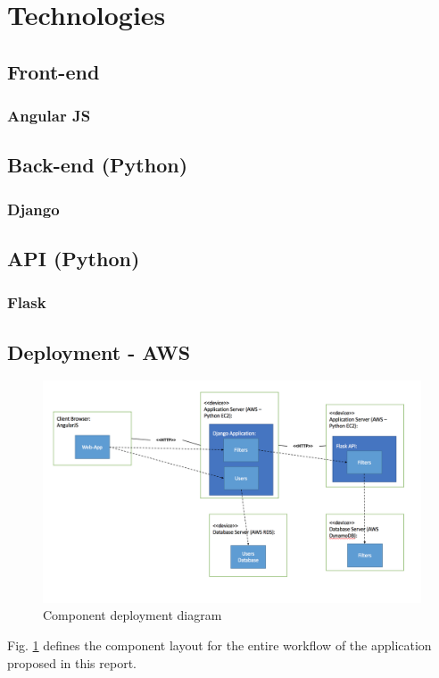 \documentclass[a4paper,12pt]{article}
\begin{document}
\section{Technologies}

  \subsection{Front-end}

    \subsubsection{Angular JS}

  \subsection{Back-end (Python)}

    \subsubsection{Django}

  \subsection{API (Python)}

    \subsubsection{Flask}


  \subsection{Deployment - AWS}

    \begin{figure}[ht]
      \centering
      \includegraphics[width=\linewidth]{deployment-diagram}
      \caption{Component deployment diagram}
      \label{fig:deployment-diagram}
    \end{figure}

    Fig. \ref{fig:deployment-diagram} defines the component layout for the entire workflow of the application proposed in this report.



\newpage
\singlespacing



\end{document}

